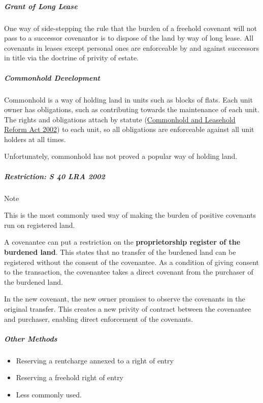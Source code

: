 \documentclass[
]{article}
\providecommand{\tightlist}{%
  \setlength{\itemsep}{0pt}\setlength{\parskip}{0pt}}
\newenvironment{env-881a4bd6-779e-4404-ae5b-86f77846f864}
{
    \savenotes\tcolorbox[blanker,breakable,left=5pt,borderline west={2pt}{-4pt}{blue}]
}
{
    \endtcolorbox\spewnotes
}
\begin{document}
\hypertarget{grant-of-long-lease}{%
\subparagraph{Grant of Long Lease}\label{grant-of-long-lease}}

One way of side-stepping the rule that the burden of a freehold covenant
will not pass to a successor covenantor is to dispose of the land by way
of long lease. All covenants in leases except personal ones are
enforceable by and against successors in title via the doctrine of
privity of estate.

\hypertarget{commonhold-development}{%
\subparagraph{Commonhold Development}\label{commonhold-development}}

Commonhold is a way of holding land in units such as blocks of flats.
Each unit owner has obligations, such as contributing towards the
maintenance of each unit. The rights and obligations attach by statute
(\href{https://www.legislation.gov.uk/ukpga/2002/15/contents}{Commonhold
and Leasehold Reform Act 2002}) to each unit, so all obligations are
enforceable against all unit holders at all times.

Unfortunately, commonhold has not proved a popular way of holding land.

\hypertarget{restriction-s-40-lra-2002}{%
\subparagraph{Restriction: S 40 LRA
2002}\label{restriction-s-40-lra-2002}}

\begin{env-881a4bd6-779e-4404-ae5b-86f77846f864}

Note

This is the most commonly used way of making the burden of positive
covenants run on registered land.

\end{env-881a4bd6-779e-4404-ae5b-86f77846f864}

A covenantee can put a restriction on the \textbf{proprietorship
register of the burdened land}. This states that no transfer of the
burdened land can be registered without the consent of the covenantee.
As a condition of giving consent to the transaction, the covenantee
takes a direct covenant from the purchaser of the burdened land.

In the new covenant, the new owner promises to observe the covenants in
the original transfer. This creates a new privity of contract between
the covenantee and purchaser, enabling direct enforcement of the
covenants.

\hypertarget{other-methods}{%
\subparagraph{Other Methods}\label{other-methods}}

\begin{itemize}
\tightlist
\item
  Reserving a rentcharge annexed to a right of entry
\item
  Reserving a freehold right of entry
\item
  Less commonly used.
\end{itemize}
\end{document}
